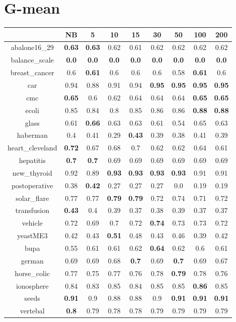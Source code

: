 \documentclass{article}%
\begin{document}
%
\section*{G{-}mean}%
\begin{tabular}{c|cccccccc}%
\hline%
&NB&5&10&15&30&50&100&200\\%
\hline%
abalone16\_29&\textbf{0.63}&\textbf{0.63}&0.62&0.61&0.62&0.62&0.62&0.62\\%
\hline%
balance\_scale&\textbf{0.0}&\textbf{0.0}&\textbf{0.0}&\textbf{0.0}&\textbf{0.0}&\textbf{0.0}&\textbf{0.0}&\textbf{0.0}\\%
\hline%
breast\_cancer&0.6&\textbf{0.61}&0.6&0.6&0.6&0.58&\textbf{0.61}&0.6\\%
\hline%
car&0.94&0.88&0.91&0.94&\textbf{0.95}&\textbf{0.95}&\textbf{0.95}&\textbf{0.95}\\%
\hline%
cmc&\textbf{0.65}&0.6&0.62&0.64&0.64&0.64&\textbf{0.65}&\textbf{0.65}\\%
\hline%
ecoli&0.85&0.84&0.8&0.85&0.86&0.86&\textbf{0.88}&\textbf{0.88}\\%
\hline%
glass&0.61&\textbf{0.66}&0.63&0.63&0.61&0.54&0.65&0.63\\%
\hline%
haberman&0.4&0.41&0.29&\textbf{0.43}&0.39&0.38&0.41&0.39\\%
\hline%
heart\_cleveland&\textbf{0.72}&0.67&0.68&0.7&0.62&0.62&0.64&0.61\\%
\hline%
hepatitis&\textbf{0.7}&\textbf{0.7}&0.69&0.69&0.69&0.69&0.69&0.69\\%
\hline%
new\_thyroid&0.92&0.89&\textbf{0.93}&\textbf{0.93}&\textbf{0.93}&\textbf{0.93}&0.91&0.91\\%
\hline%
postoperative&0.38&\textbf{0.42}&0.27&0.27&0.27&0.0&0.19&0.19\\%
\hline%
solar\_flare&0.77&0.77&\textbf{0.79}&\textbf{0.79}&0.72&0.74&0.71&0.72\\%
\hline%
transfusion&\textbf{0.43}&0.4&0.39&0.37&0.38&0.39&0.37&0.37\\%
\hline%
vehicle&0.72&0.69&0.7&0.72&\textbf{0.74}&0.73&0.73&0.72\\%
\hline%
yeastME3&0.42&0.43&\textbf{0.51}&0.48&0.43&0.46&0.39&0.42\\%
\hline%
bupa&0.55&0.61&0.61&0.62&\textbf{0.64}&0.62&0.6&0.61\\%
\hline%
german&0.69&0.69&0.68&\textbf{0.7}&0.69&\textbf{0.7}&0.69&0.67\\%
\hline%
horse\_colic&0.77&0.75&0.77&0.76&0.78&\textbf{0.79}&0.78&0.76\\%
\hline%
ionosphere&0.84&0.83&0.85&0.84&0.85&0.85&\textbf{0.86}&0.85\\%
\hline%
seeds&\textbf{0.91}&0.9&0.88&0.88&0.9&\textbf{0.91}&\textbf{0.91}&\textbf{0.91}\\%
\hline%
vertebal&\textbf{0.8}&0.79&0.78&0.78&0.79&0.79&0.79&0.79\\%
\hline%
\end{tabular}

%
\end{document}
